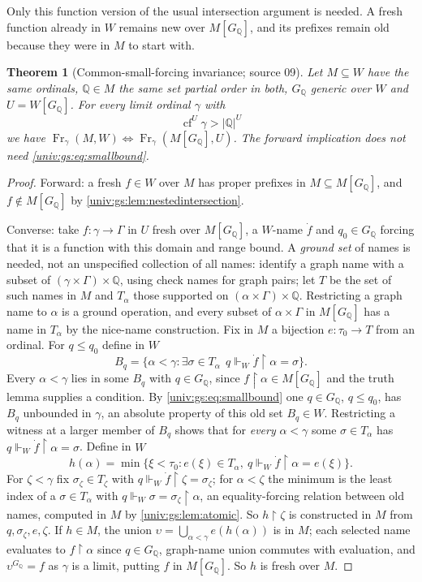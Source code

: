 \documentclass[11pt,letterpaper]{article}
\numberwithin{equation}{section}
\newtheorem{theorem}{Theorem}[section]
\theoremstyle{definition}
\theoremstyle{remark}
\newcommand{\cf}{\operatorname{cf}}
\newcommand{\res}{\mathbin{\upharpoonright}}
\newcommand{\abs}[1]{\lvert#1\rvert}
\newcommand{\Fr}{\operatorname{Fr}}
\newcommand{\forces}{\Vdash}
\begin{document}
Only this function version of the usual intersection argument is needed. A fresh function
already in $W$ remains new over $M[G_{\mathbb Q}]$, and its prefixes remain old because they
were in $M$ to start with.

\begin{theorem}[Common-small-forcing invariance; source 09]\label{univ:gs:thm:basechange}
Let $M\subseteq W$ have the same ordinals, $\mathbb Q\in M$ the same set partial order in both,
$G_{\mathbb Q}$ generic over $W$ and $U=W[G_{\mathbb Q}]$. For every limit ordinal $\gamma$ with
\begin{equation}\label{univ:gs:eq:smallbound}
 \cf^U\gamma>\abs{\mathbb Q}^U
\end{equation}
we have $\Fr_\gamma(M,W)\iff\Fr_\gamma(M[G_{\mathbb Q}],U)$. The forward implication does not
need \eqref{univ:gs:eq:smallbound}.
\end{theorem}
\begin{proof}
Forward: a fresh $f\in W$ over $M$ has proper prefixes in $M\subseteq M[G_{\mathbb Q}]$, and
$f\notin M[G_{\mathbb Q}]$ by \cref{univ:gs:lem:nestedintersection}.

Converse: take $f:\gamma\to\Gamma$ in $U$ fresh over $M[G_{\mathbb Q}]$, a $W$-name $\dot f$ and
$q_0\in G_{\mathbb Q}$ forcing that it is a function with this domain and range bound. A
\emph{ground set} of names is needed, not an unspecified collection of all names: identify a
graph name with a subset of $(\gamma\times\Gamma)\times\mathbb Q$, using check names for graph
pairs; let $T$ be the set of such names in $M$ and $T_\alpha$ those supported on
$(\alpha\times\Gamma)\times\mathbb Q$. Restricting a graph name to $\alpha$ is a ground operation,
and every subset of $\alpha\times\Gamma$ in $M[G_{\mathbb Q}]$ has a name in $T_\alpha$ by the
nice-name construction. Fix in $M$ a bijection $e:\tau_0\to T$ from an ordinal. For $q\le q_0$
define in $W$
\[
 B_q=\{\alpha<\gamma:\exists\sigma\in T_\alpha\ \ q\forces_W\dot f\res\alpha=\sigma\}.
\]
Every $\alpha<\gamma$ lies in some $B_q$ with $q\in G_{\mathbb Q}$, since $f\res\alpha\in
M[G_{\mathbb Q}]$ and the truth lemma supplies a condition. By \eqref{univ:gs:eq:smallbound}
one $q\in G_{\mathbb Q}$, $q\le q_0$, has $B_q$ unbounded in $\gamma$, an absolute property of
this old set $B_q\in W$. Restricting a witness at a larger member of $B_q$ shows that for
\emph{every} $\alpha<\gamma$ some $\sigma\in T_\alpha$ has $q\forces_W\dot f\res\alpha=\sigma$.
Define in $W$
\[
 h(\alpha)=\min\{\xi<\tau_0:e(\xi)\in T_\alpha,\ q\forces_W\dot f\res\alpha=e(\xi)\}.
\]
For $\zeta<\gamma$ fix $\sigma_\zeta\in T_\zeta$ with $q\forces_W\dot f\res\zeta=\sigma_\zeta$;
for $\alpha<\zeta$ the minimum is the least index of a $\sigma\in T_\alpha$ with
$q\forces_W\sigma=\sigma_\zeta\res\alpha$, an equality-forcing relation between old names,
computed in $M$ by \cref{univ:gs:lem:atomic}. So $h\res\zeta$ is constructed in $M$ from
$q,\sigma_\zeta,e,\zeta$. If $h\in M$, the union $\upsilon=\bigcup_{\alpha<\gamma}e(h(\alpha))$ is
in $M$; each selected name evaluates to $f\res\alpha$ since $q\in G_{\mathbb Q}$, graph-name union
commutes with evaluation, and $\upsilon^{G_{\mathbb Q}}=f$ as $\gamma$ is a limit, putting $f$
in $M[G_{\mathbb Q}]$. So $h$ is fresh over $M$.
\end{proof}
\end{document}

